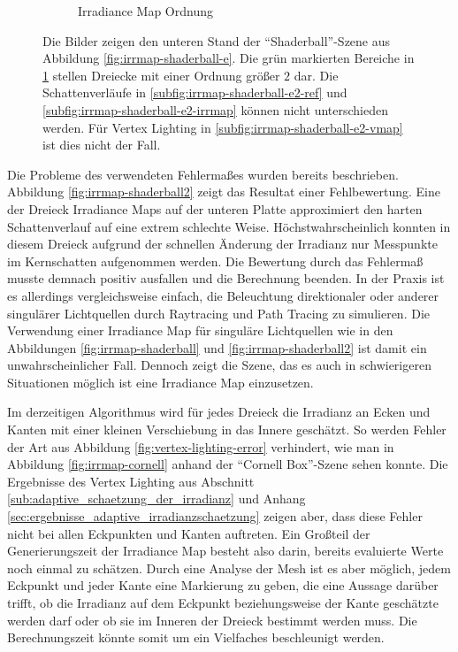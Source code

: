 \begin{figure}[h]
\begin{subfigure}[t]{\textwidth}
				\caption{Irradiance Map Ordnung}
				\label{subfig:irrmap-shaderball-e2-irrmap-order}
			\end{subfigure}
			\caption[Irradiance-Map der \enquote{Shaderball}-Szene mit der \enquote{Ennis-Brown House}-HDR im unteren Stand]{Die Bilder zeigen den unteren Stand der \enquote{Shaderball}-Szene aus Abbildung \ref{fig:irrmap-shaderball-e}. Die grün markierten Bereiche in \ref{subfig:irrmap-shaderball-e2-irrmap-order} stellen Dreiecke mit einer Ordnung größer $2$ dar. Die Schattenverläufe in \ref{subfig:irrmap-shaderball-e2-ref} und \ref{subfig:irrmap-shaderball-e2-irrmap} können nicht unterschieden werden. Für Vertex Lighting in \ref{subfig:irrmap-shaderball-e2-vmap} ist dies nicht der Fall.}
			\label{fig:irrmap-shaderball-e2}
		\end{figure}

		Die Probleme des verwendeten Fehlermaßes wurden bereits beschrieben.
		Abbildung \ref{fig:irrmap-shaderball2} zeigt das Resultat einer Fehlbewertung.
		Eine der Dreieck Irradiance Maps auf der unteren Platte approximiert den harten Schattenverlauf auf eine extrem schlechte Weise.
		Höchstwahrscheinlich konnten in diesem Dreieck aufgrund der schnellen Änderung der Irradianz nur Messpunkte im Kernschatten aufgenommen werden.
		Die Bewertung durch das Fehlermaß musste demnach positiv ausfallen und die Berechnung beenden.
		In der Praxis ist es allerdings vergleichsweise einfach, die Beleuchtung direktionaler oder anderer singulärer Lichtquellen durch Raytracing und Path Tracing zu simulieren.
		Die Verwendung einer Irradiance Map für singuläre Lichtquellen wie in den Abbildungen \ref{fig:irrmap-shaderball} und \ref{fig:irrmap-shaderball2} ist damit ein unwahrscheinlicher Fall.
		Dennoch zeigt die Szene, das es auch in schwierigeren Situationen möglich ist eine Irradiance Map einzusetzen.


		Im derzeitigen Algorithmus wird für jedes Dreieck die Irradianz an Ecken und Kanten mit einer kleinen Verschiebung in das Innere  geschätzt.
		So werden Fehler der Art aus Abbildung \ref{fig:vertex-lighting-error} verhindert, wie man in Abbildung \ref{fig:irrmap-cornell} anhand der \enquote{Cornell Box}-Szene sehen konnte.
		Die Ergebnisse des Vertex Lighting aus Abschnitt \ref{sub:adaptive_schaetzung_der_irradianz} und Anhang \ref{sec:ergebnisse_adaptive_irradianzschaetzung} zeigen aber, dass diese Fehler nicht bei allen Eckpunkten und Kanten auftreten.
		Ein Großteil der Generierungszeit der Irradiance Map besteht also darin, bereits evaluierte Werte noch einmal zu schätzen.
		Durch eine Analyse der Mesh ist es aber möglich, jedem Eckpunkt und jeder Kante eine Markierung zu geben, die eine Aussage darüber trifft, ob die Irradianz auf dem Eckpunkt beziehungsweise der Kante geschätzte werden darf oder ob sie im Inneren der Dreieck bestimmt werden muss.
		Die Berechnungszeit könnte somit um ein Vielfaches beschleunigt werden.


